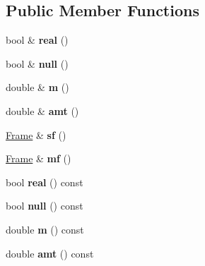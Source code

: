 \subsection*{Public Member Functions}
\begin{DoxyCompactItemize}
\item 
\hypertarget{classvsr_1_1_orbit_afef67ad1da8d51bc34f6fdf3f37860f6}{bool \& {\bfseries real} ()}\label{classvsr_1_1_orbit_afef67ad1da8d51bc34f6fdf3f37860f6}

\item 
\hypertarget{classvsr_1_1_orbit_a4611b85b0008a2ee9dd820ca99ef5375}{bool \& {\bfseries null} ()}\label{classvsr_1_1_orbit_a4611b85b0008a2ee9dd820ca99ef5375}

\item 
\hypertarget{classvsr_1_1_orbit_a0499b9896646ba773ac9371264c35100}{double \& {\bfseries m} ()}\label{classvsr_1_1_orbit_a0499b9896646ba773ac9371264c35100}

\item 
\hypertarget{classvsr_1_1_orbit_a6c6178658664cc2f5100b5420d8d3c2c}{double \& {\bfseries amt} ()}\label{classvsr_1_1_orbit_a6c6178658664cc2f5100b5420d8d3c2c}

\item 
\hypertarget{classvsr_1_1_orbit_a0eb572c84266ad24a1cef9cce3ef8bd2}{\hyperlink{classvsr_1_1_frame}{Frame} \& {\bfseries sf} ()}\label{classvsr_1_1_orbit_a0eb572c84266ad24a1cef9cce3ef8bd2}

\item 
\hypertarget{classvsr_1_1_orbit_a945956b3f77869974e9cc89144cc5477}{\hyperlink{classvsr_1_1_frame}{Frame} \& {\bfseries mf} ()}\label{classvsr_1_1_orbit_a945956b3f77869974e9cc89144cc5477}

\item 
\hypertarget{classvsr_1_1_orbit_a7eaf6e73cf177be4308959f7128c054b}{bool {\bfseries real} () const }\label{classvsr_1_1_orbit_a7eaf6e73cf177be4308959f7128c054b}

\item 
\hypertarget{classvsr_1_1_orbit_afdae03380c6b1f09e3e10012b0123198}{bool {\bfseries null} () const }\label{classvsr_1_1_orbit_afdae03380c6b1f09e3e10012b0123198}

\item 
\hypertarget{classvsr_1_1_orbit_a0ca9d417edbfc3d9738704b40c003751}{double {\bfseries m} () const }\label{classvsr_1_1_orbit_a0ca9d417edbfc3d9738704b40c003751}

\item 
\hypertarget{classvsr_1_1_orbit_ab0c54715c95839223119183d207cf442}{double {\bfseries amt} () const }\label{classvsr_1_1_orbit_ab0c54715c95839223119183d207cf442}


\end{DoxyCompactItemize}
